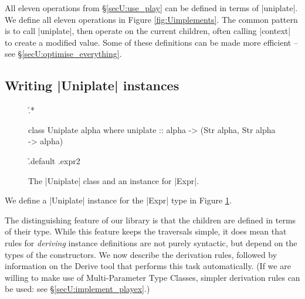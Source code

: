 All eleven operations from \S\ref{secU:use_play} can be defined in terms of |uniplate|. We define all eleven operations in Figure \ref{fig:Uimplements}. The common pattern is to call |uniplate|, then operate on the current children, often calling |context| to create a modified value. Some of these definitions can be made more efficient -- see \S\ref{secU:optimise_everything}.

\subsection{Writing |Uniplate| instances}
\label{secU:play_instances}

\begin{figure}
\h{.*}\begin{code}
class Uniplate alpha where
    uniplate :: alpha -> (Str alpha, Str alpha -> alpha)
\end{code}
\h{.default .expr2}
\caption{The |Uniplate| class and an instance for |Expr|.}
\label{figU:play_expr}
\end{figure}

We define a |Uniplate| instance for the |Expr| type in Figure \ref{figU:play_expr}.

The distinguishing feature of our library is that the children are defined in terms of their type. While this feature keeps the traversals simple, it does mean that rules for \textit{deriving} instance definitions are not purely syntactic, but depend on the types of the constructors. We now describe the derivation rules, followed by information on the Derive tool that performs this task automatically. (If we are willing to make use of Multi-Parameter Type Classes, simpler derivation rules can be used: see \S\ref{secU:implement_playex}.)


